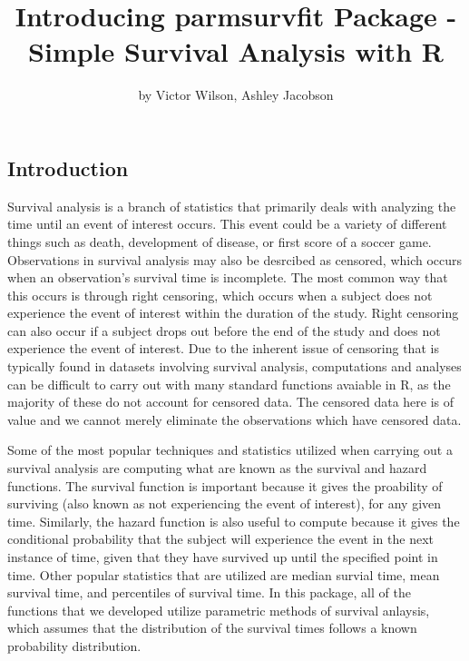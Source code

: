 \title{Introducing parmsurvfit Package - Simple Survival Analysis with R}
\author{by Victor Wilson, Ashley Jacobson}

\maketitle



\hypertarget{introduction}{%
\subsection{Introduction}\label{introduction}}

Survival analysis is a branch of statistics that primarily deals with
analyzing the time until an event of interest occurs. This event could
be a variety of different things such as death, development of disease,
or first score of a soccer game. Observations in survival analysis may
also be desrcibed as censored, which occurs when an observation's
survival time is incomplete. The most common way that this occurs is
through right censoring, which occurs when a subject does not experience
the event of interest within the duration of the study. Right censoring
can also occur if a subject drops out before the end of the study and
does not experience the event of interest. Due to the inherent issue of
censoring that is typically found in datasets involving survival
analysis, computations and analyses can be difficult to carry out with
many standard functions avaiable in R, as the majority of these do not
account for censored data. The censored data here is of value and we
cannot merely eliminate the observations which have censored data.

Some of the most popular techniques and statistics utilized when
carrying out a survival analysis are computing what are known as the
survival and hazard functions. The survival function is important
because it gives the proability of surviving (also known as not
experiencing the event of interest), for any given time. Similarly, the
hazard function is also useful to compute because it gives the
conditional probability that the subject will experience the event in
the next instance of time, given that they have survived up until the
specified point in time. Other popular statistics that are utilized are
median survial time, mean survival time, and percentiles of survival
time. In this package, all of the functions that we developed utilize
parametric methods of survival anlaysis, which assumes that the
distribution of the survival times follows a known probability
distribution.

